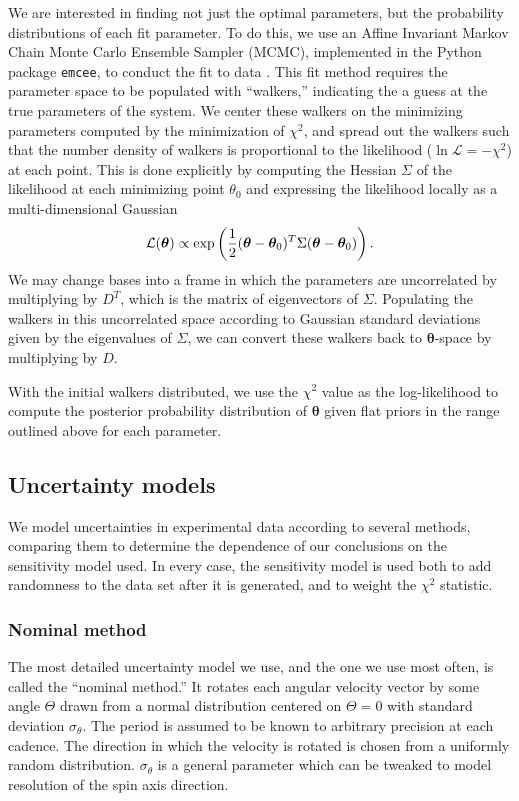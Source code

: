 \documentclass[11pt]{article}
\begin{document}
We are interested in finding not just the optimal parameters, but the probability distributions of each fit parameter. To do this, we use an Affine Invariant Markov Chain Monte Carlo Ensemble Sampler (MCMC), implemented in the Python package \texttt{emcee}, to conduct the fit to data \cite{ForemanMackey2013emceeTM}. This fit method requires the parameter space to be populated with ``walkers,'' indicating the a guess at the true parameters of the system. We center these walkers on the minimizing parameters computed by the minimization of $\chi^2$, and spread out the walkers such that the number density of walkers is proportional to the likelihood ($\ln \mathcal{L} = -\chi^2$) at each point. This is done explicitly by computing the Hessian $\Sigma$ of the likelihood at each minimizing point $\theta_0$ and expressing the likelihood locally as a multi-dimensional Gaussian
\begin{equation}
\mathcal{L}(\bm \theta) \propto \text{exp}\left( \frac{1}{2}(\bm \theta-\bm \theta_0)^T \Sigma (\bm \theta-\bm \theta_0) \right).
\end{equation}
We may change bases into a frame in which the parameters are uncorrelated by multiplying by $D^T$, which is the matrix of eigenvectors of $\Sigma$. Populating the walkers in this uncorrelated space according to Gaussian standard deviations given by the eigenvalues of $\Sigma$, we can convert these walkers back to $\bm \theta$-space by multiplying by $D$.

With the initial walkers distributed, we use the $\chi^2$ value as the log-likelihood to compute the posterior probability distribution of $\bm \theta$ given flat priors in the range outlined above for each parameter.


\subsection{Uncertainty models}
\label{sec:uncertainty-models}
We model uncertainties in experimental data according to several methods, comparing them to determine the dependence of our conclusions on the sensitivity model used. In every case, the sensitivity model is used both to add randomness to the data set after it is generated, and to weight the $\chi^2$ statistic.

\subsubsection{Nominal method}
The most detailed uncertainty model we use, and the one we use most often, is called the ``nominal method.'' It rotates each angular velocity vector by some angle $\Theta$ drawn from a normal distribution centered on $\Theta=0$ with standard deviation $\sigma_\theta$. The period is assumed to be known to arbitrary precision at each cadence. The direction in which the velocity is rotated is chosen from a uniformly random distribution. $\sigma_\theta$ is a general parameter which can be tweaked to model resolution of the spin axis direction.
\end{document}
